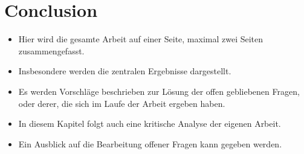 
\chapter{Conclusion} %
\label{chap:conclusion}

\begin{itemize}
  \item Hier wird die gesamte Arbeit auf einer Seite, maximal zwei Seiten zusammengefasst.
  \item Insbesondere werden die zentralen Ergebnisse dargestellt.
  \item Es werden Vorschläge beschrieben zur Lösung der offen gebliebenen Fragen, oder derer, die sich im Laufe der Arbeit ergeben haben.
  \item In diesem Kapitel folgt auch eine kritische Analyse der eigenen Arbeit.
  \item Ein Ausblick auf die Bearbeitung offener Fragen kann gegeben werden.
\end{itemize}
